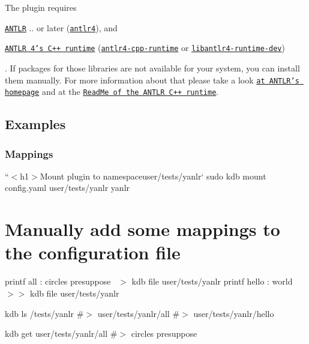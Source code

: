 The plugin requires


\begin{DoxyItemize}
\item \href{https://www.antlr.org}{\tt A\+N\+T\+LR} {..} or later (\href{https://repology.org/metapackage/antlr4}{\tt {\ttfamily antlr4}}), and
\item \href{https://github.com/antlr/antlr4/tree/master/runtime/Cpp}{\tt A\+N\+T\+LR 4’s C++ runtime} (\href{https://repology.org/metapackage/antlr4-cpp-runtime}{\tt {\ttfamily antlr4-\/cpp-\/runtime}} or \href{https://packages.debian.org/search?searchon=names&keywords=libantlr4-runtime-dev}{\tt {\ttfamily libantlr4-\/runtime-\/dev}})
\end{DoxyItemize}

. If packages for those libraries are not available for your system, you can install them manually. For more information about that please take a look \href{https://www.antlr.org}{\tt at A\+N\+T\+L\+R’s homepage} and at the \href{https://github.com/antlr/antlr4/tree/master/runtime/Cpp}{\tt Read\+Me of the A\+N\+T\+LR C++ runtime}.

\subsection*{Examples}

\subsubsection*{Mappings}

``{\ttfamily  $<$h1$>$Mount plugin to namespace}user/tests/yanlr` sudo kdb mount config.\+yaml user/tests/yanlr yanlr

\section*{Manually add some mappings to the configuration file}

printf \textquotesingle{}all \+: circles presuppose~\newline
\textquotesingle{} $>$ {\ttfamily kdb file user/tests/yanlr} printf \textquotesingle{}hello \+: world~\newline
\textquotesingle{} $>$$>$ {\ttfamily kdb file user/tests/yanlr}

kdb ls /tests/yanlr \#$>$ user/tests/yanlr/all \#$>$ user/tests/yanlr/hello

kdb get user/tests/yanlr/all \#$>$ circles presuppose

